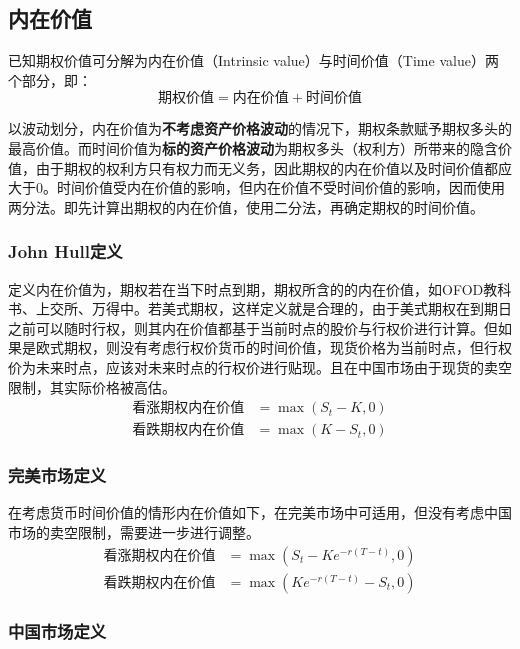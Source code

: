 \documentclass[11pt]{article}
\begin{document}
\subsection{内在价值}

已知期权价值可分解为内在价值（Intrinsic value）与时间价值（Time value）两个部分，即：
\begin{equation*}
    \boxed{
        \text{期权价值} = \text{内在价值} + \text{时间价值}
    }
\end{equation*}

以波动划分，内在价值为\textbf{不考虑资产价格波动}的情况下，期权条款赋予期权多头的最高价值。而时间价值为\textbf{标的资产价格波动}为期权多头（权利方）所带来的隐含价值，由于期权的权利方只有权力而无义务，因此期权的内在价值以及时间价值都应大于0。时间价值受内在价值的影响，但内在价值不受时间价值的影响，因而使用两分法。即先计算出期权的内在价值，使用二分法，再确定期权的时间价值。

\subsubsection*{John Hull定义}

定义内在价值为，期权若在当下时点到期，期权所含的的内在价值，如OFOD教科书、上交所、万得中。若美式期权，这样定义就是合理的，由于美式期权在到期日之前可以随时行权，则其内在价值都基于当前时点的股价与行权价进行计算。但如果是欧式期权，则没有考虑行权价货币的时间价值，现货价格为当前时点，但行权价为未来时点，应该对未来时点的行权价进行贴现。且在中国市场由于现货的卖空限制，其实际价格被高估。
\noindent\begin{align*}
    \text{看涨期权内在价值} & = \max(S_t-K,0) \\
    \text{看跌期权内在价值} & = \max(K-S_t,0)
\end{align*}

\subsubsection*{完美市场定义}

在考虑货币时间价值的情形内在价值如下，在完美市场中可适用，但没有考虑中国市场的卖空限制，需要进一步进行调整。
\begin{align*}
    \text{看涨期权内在价值} & = \max\left(S_t-Ke^{-r(T-t)},0\right) \\
    \text{看跌期权内在价值} & = \max\left(Ke^{-r(T-t)}-S_t,0\right)
\end{align*}

\subsubsection*{中国市场定义}
\end{document}
